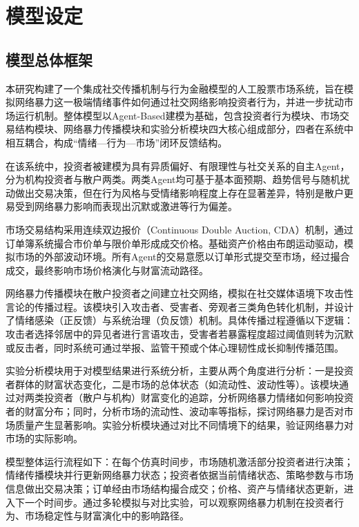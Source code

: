 \chapter{模型设定}




\section{模型总体框架}

本研究构建了一个集成社交传播机制与行为金融模型的人工股票市场系统，旨在模拟网络暴力这一极端情绪事件如何通过社交网络影响投资者行为，并进一步扰动市场运行机制。整体模型以Agent-Based建模为基础，包含投资者行为模块、市场交易结构模块、网络暴力传播模块和实验分析模块四大核心组成部分，四者在系统中相互耦合，构成“情绪—行为—市场”闭环反馈结构。

在该系统中，投资者被建模为具有异质偏好、有限理性与社交关系的自主Agent，分为机构投资者与散户两类。两类Agent均可基于基本面预期、趋势信号与随机扰动做出交易决策，但在行为风格与受情绪影响程度上存在显著差异，特别是散户更易受到网络暴力影响而表现出沉默或激进等行为偏差。

市场交易结构采用连续双边报价（Continuous Double Auction, CDA）机制，通过订单簿系统撮合市价单与限价单形成成交价格。基础资产价格由布朗运动驱动，模拟市场的外部波动环境。所有Agent的交易意愿以订单形式提交至市场，经过撮合成交，最终影响市场价格演化与财富流动路径。

网络暴力传播模块在散户投资者之间建立社交网络，模拟在社交媒体语境下攻击性言论的传播过程。该模块引入攻击者、受害者、旁观者三类角色转化机制，并设计了情绪感染（正反馈）与系统治理（负反馈）机制。具体传播过程遵循以下逻辑：攻击者选择邻居中的异见者进行言语攻击，受害者若暴露程度超过阈值则转为沉默或反击者，同时系统可通过举报、监管干预或个体心理韧性成长抑制传播范围。

实验分析模块用于对模型结果进行系统分析，主要从两个角度进行分析：一是投资者群体的财富状态变化，二是市场的总体状态（如流动性、波动性等）。该模块通过对两类投资者（散户与机构）财富变化的追踪，分析网络暴力情绪如何影响投资者的财富分布；同时，分析市场的流动性、波动率等指标，探讨网络暴力是否对市场质量产生显著影响。实验分析模块通过对比不同情境下的结果，验证网络暴力对市场的实际影响。

模型整体运行流程如下：在每个仿真时间步，市场随机激活部分投资者进行决策；情绪传播模块并行更新网络暴力状态；投资者依据当前情绪状态、策略参数与市场信息做出交易决策；订单经由市场结构撮合成交；价格、资产与情绪状态更新，进入下一个时间步。通过多轮模拟与对比实验，可以观察网络暴力机制在投资者行为、市场稳定性与财富演化中的影响路径。


